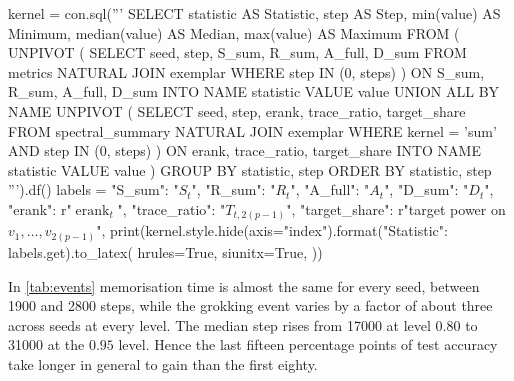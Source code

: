 \documentclass[a4paper,11pt]{article} %
\begin{document}
\begin{table}[H]
  \centering
  \caption{Statistics \eqref{eq:statistics} and spectral measures
    \eqref{eq:erank} of the sum kernel of the pilot cell, with the alignment on the
    tangent kernel of all logits, at initialisation and at the last step, and the share of the centred target's
    power on the $2(p-1)$ leading eigenvectors. Minimum, median and maximum over
  seeds.}
  \label{tab:kernel}
\begin{pycode}
kernel = con.sql('''
    SELECT statistic AS Statistic, step AS Step, min(value) AS Minimum,
        median(value) AS Median, max(value) AS Maximum
    FROM (
        UNPIVOT (
            SELECT seed, step, S_sum, R_sum, A_full, D_sum
            FROM metrics NATURAL JOIN exemplar
            WHERE step IN (0, steps)
        ) ON S_sum, R_sum, A_full, D_sum INTO NAME statistic VALUE value
        UNION ALL BY NAME
        UNPIVOT (
            SELECT seed, step, erank, trace_ratio, target_share
            FROM spectral_summary NATURAL JOIN exemplar
            WHERE kernel = 'sum' AND step IN (0, steps)
        ) ON erank, trace_ratio, target_share INTO NAME statistic VALUE value
    )
    GROUP BY statistic, step
    ORDER BY statistic, step
''').df()
labels = {
    "S_sum": "$S_t$",
    "R_sum": "$R_t$",
    "A_full": "$A_t$",
    "D_sum": "$D_t$",
    "erank": r"$\operatorname{erank}_t$",
    "trace_ratio": "$T_{t,2(p-1)}$",
    "target_share": r"target power on $v_1,\dots,v_{2(p-1)}$",
}
print(kernel.style.hide(axis="index").format({"Statistic": labels.get}).to_latex(
    hrules=True, siunitx=True,
))
\end{pycode}
\end{table}

In \cref{tab:events} memorisation time is almost the same for every seed, between
\num{1900} and \num{2800} steps, while the grokking event varies by a factor of about
three across seeds at every level. The median step rises from \num{17000} at level
$0.80$ to \num{31000} at the $0.95$ level. Hence the last fifteen percentage
points of test accuracy take longer in general to gain than the first eighty.
\end{document}
